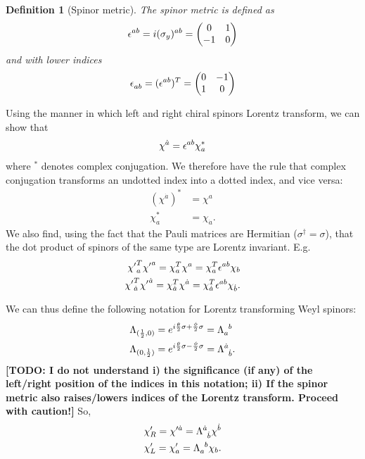 \documentclass[11pt]{article}
\numberwithin{equation}{section}
\newcommand{\tn}[2]{\tensor{#1}{#2}}
\newtheorem{defn}{Definition}[section]
\begin{document}
\begin{defn}[Spinor metric]
The spinor metric is defined as 
\begin{equation}
\tn{\epsilon}{^a^b} = i \tn{(\sigma_y)}{^a^b} = \begin{pmatrix}
0 & 1 \\
-1 & 0
\end{pmatrix}
\end{equation}
and with lower indices
\begin{equation}
\tn{\epsilon}{_a_b} = (\tn{\epsilon}{^a^b})^T = \begin{pmatrix}
0 & -1 \\
1 & 0
\end{pmatrix}
\end{equation}
\end{defn}

Using the manner in which left and right chiral spinors Lorentz transform, we can show that
\begin{equation}
\chi^{\dot{a}} = \tn{\epsilon}{^a^b} \chi^*_a
\end{equation}
where $^*$ denotes complex conjugation. We therefore have the rule that complex conjugation transforms an undotted index into a dotted index, and vice versa:
\begin{align}
(\chi^{\dot{a}})^* &= \chi^a  \\
\chi_a^* &= \chi_{\dot{a}}.
\end{align}
We also find, using the fact that the Pauli matrices are Hermitian ($\sigma^\dagger = \sigma$), that the dot product of spinors of the same type are Lorentz invariant. E.g.
\begin{align}
{\chi'}_a^T {\chi'}^a = \chi_a^T \chi^a = \chi_a^T \tn{\epsilon}{^a^b}\chi_b \\
{\chi'}_{\dot{a}}^T {\chi'}^{\dot{a}} = \chi_{\dot{a}}^T \chi^{\dot{a}} = \chi_{\dot{a}}^T \tn{\epsilon}{^a^b}\chi_{\dot{b}}.
\end{align}

We can thus define the following notation for Lorentz transforming Weyl spinors:
\begin{align}
\Lambda_{(\frac{1}{2},0)} &=  e^{i \frac{\theta}{2}\sigma + \frac{\phi}{2} \sigma} = \tn{\Lambda}{_a^b}  \\
\Lambda_{(0, \frac{1}{2})} &=  e^{i \frac{\theta}{2}\sigma - \frac{\phi}{2} \sigma} = \tn{\Lambda}{^{\dot{a}}_{\dot{b}}}.
\end{align}
\textbf{[TODO: I do not understand i) the significance (if any) of the left/right position of the indices in this notation; ii) If the spinor metric also raises/lowers indices of the Lorentz transform. Proceed with caution!]} So,
\begin{align}
\chi'_R = \chi'^{\dot{a}} = \tn{\Lambda}{^{\dot{a}}_{\dot{b}}} \chi^{\dot{b}} \\
\chi'_L = \chi'_{a} = \tn{\Lambda}{_a^b} \chi_b. \\
\end{align}

\newpage
 
\end{document}
